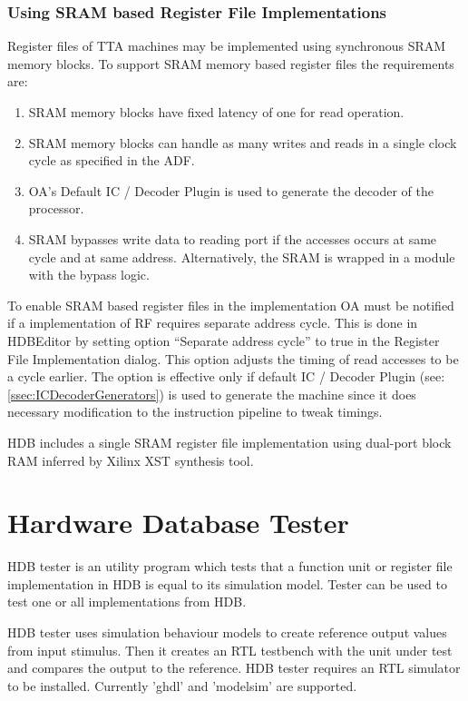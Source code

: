 \documentclass[a4paper,twoside]{tceusermanual}
\begin{document}
\subsubsection{Using SRAM based Register File Implementations}
Register files of TTA machines may be implemented using synchronous
SRAM memory blocks. To support SRAM memory based register files the
requirements are:

\begin{enumerate}
  \item SRAM memory blocks have fixed latency of one for read operation.
  \item SRAM memory blocks can handle as many writes and reads in a
    single clock cycle as specified in the ADF.
  \item OA's Default IC / Decoder Plugin is used to generate the
    decoder of the processor.
  \item \label{itm:bypass_req} SRAM bypasses write data to reading
    port if the accesses occurs at same cycle and at same
    address. Alternatively, the SRAM is wrapped in a module with the
    bypass logic.
\end{enumerate}

To enable SRAM based register files in the implementation OA must be
notified if a implementation of RF requires separate address
cycle. This is done in HDBEditor by setting option ``Separate address
cycle'' to true in the Register File Implementation dialog. This
option adjusts the timing of read accesses to be a cycle earlier. The
option is effective only if default IC / Decoder Plugin (see:
\ref{ssec:ICDecoderGenerators}) is used to generate the machine since
it does necessary modification to the instruction pipeline to tweak
timings.

HDB includes a single SRAM register file implementation using
dual-port block RAM inferred by Xilinx XST synthesis tool.

\section{Hardware Database Tester}
\label{sec:hdbtester}

HDB tester is an utility program which tests that a function unit or register
file implementation in HDB is equal to its simulation model. Tester can be used
to test one or all implementations from HDB.

HDB tester uses simulation behaviour models to create reference output values
from input stimulus. Then it creates an RTL testbench with the unit under test
and compares the output to the reference. HDB tester requires an RTL simulator
to be installed. Currently 'ghdl' and 'modelsim' are supported.
\end{document}
